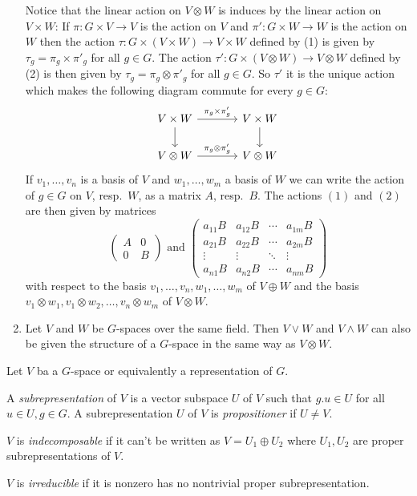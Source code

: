 \begin{example}
\begin{enumerate}[label=\emph{\alph*)},leftmargin=*]
      Notice that the linear action on $V \otimes W$ is induces by the linear action on $V \times W$:
      If $\pi \colon G \times V \to V$ is the action on $V$ and $\pi' \colon G \times W \to W$ is the action on $W$ then the action $\tau \colon G \times (V \times W) \to V \times W$ defined by (1) is given by $\tau_g = \pi_g \times \pi'_g$ for all $g \in G$.
      The action $\tau' \colon G \times (V \otimes W) \to V \otimes W$ defined by (2) is then given by $\tau_g = \pi_g \otimes \pi'_g$ for all $g \in G$.
      So $\tau'$ it is the unique action which makes the following diagram commute for every $g \in G$:
      \[
        \begin{tikzcd}[column sep = large]
            V \times W
            \arrow{r}{\pi_g \times \pi'_g}
            \arrow{d}
          & V \times W
            \arrow{d}
          \\
            V \otimes W
            \arrow{r}{\pi_g \otimes \pi'_g}
          & V \otimes W
        \end{tikzcd}
      \]
      If $v_1, \dotsc, v_n$ is a basis of $V$ and $w_1, \dotsc, w_m$ a basis of $W$ we can write the action of $g \in G$ on $V$, resp.\ $W$, as a matrix $A$, resp.\ $B$.
      The actions $(1)$ and $(2)$ are then given by matrices
      \[
        \begin{pmatrix}
          A & 0 \\
          0 & B
        \end{pmatrix}
        \text{ and }
        \begin{pmatrix}
          a_{11} B & a_{12} B & \cdots & a_{1m} B \\
          a_{21} B & a_{22} B & \cdots & a_{2m} B \\
            \vdots  &  \vdots  & \ddots &  \vdots  \\
          a_{n1} B & a_{n2} B & \cdots & a_{nm} B
        \end{pmatrix}
      \]
      with respect to the basis $v_1, \dotsc, v_n, w_1, \dotsc, w_m$ of $V \oplus W$ and the basis $v_1 \otimes w_1, v_1 \otimes w_2, \dotsc, v_n \otimes w_m$ of $V \otimes W$.
    \item
      Let $V$ and $W$ be $G$-spaces over the same field.
      Then $V \vee W$ and $V \wedge W$ can also be given the structure of a $G$-space in the same way as $V \otimes W$.
  \end{enumerate}
\end{example}


\begin{definition}
    Let $V$ ba a $G$-space or equivalently a representation of $G$.

    A \emph{subrepresentation} of $V$ is a vector subspace $U$ of $V$ such that $g.u \in U$ for all $u \in U, g \in G$.
    A subrepresentation $U$ of $V$ is \emph{propositioner} if $U \neq V$.
    
    $V$ is \emph{indecomposable} if it can’t be written as $V = U_1 \oplus U_2$ where $U_1, U_2$ are proper subrepresentations of $V$.
    
    $V$ is \emph{irreducible} if it is nonzero has no nontrivial proper subrepresentation.
\end{definition}

